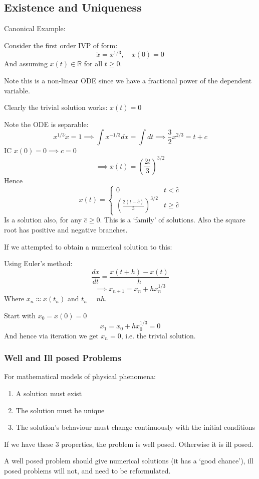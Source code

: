 \documentclass{/home/janmebows/Documents/LatexTemplates/myassignment}
\begin{document}
\subsection{Existence and Uniqueness}
Canonical Example:

Consider the first order IVP of form:
\[\dot x = x^{1/3},\quad x(0) = 0\]
And assuming $x(t) \in \mathbb{R}$ for all $t\geq 0$.

Note this is a non-linear ODE since we have a fractional power of the dependent variable.

Clearly the trivial solution works: $x(t) =0$

Note the ODE is separable:
\[x^{1/3} \dot x = 1 \implies \int x^{-1/3} dx = \int dt \implies \frac32 x^{2/3} = t+c\]
IC $x(0) = 0 \implies c=0$ 
\[\implies x(t) = \left(\frac{2t}{3}\right)^{3/2}\]
Hence
\[x(t) = \begin{cases}
    0& t < \hat c\\
    \left(\frac{2(t-\hat c)}{3}\right)^{3/2} & t\geq \hat c
\end{cases}\]
Is a solution also, for any $\hat c \geq 0$. This is a `family' of solutions. Also the square root has positive and negative branches.


If we attempted to obtain a numerical solution to this:

Using Euler's method:
\[\frac{dx}{dt} = \frac{x(t+h) - x(t)}{h}\]
\[\implies x_{n+1} = x_n + h x_n^{1/3}\]
Where $x_n \approx x(t_n)$ and $t_n = nh$.

Start with $x_0 = x(0) =0$
\[x_1 = x_0 + hx_0^{1/3} =0\]
And hence via iteration we get $x_n = 0$, i.e. the trivial solution.

\subsubsection{Well and Ill posed Problems}
For mathematical models of physical phenomena:
\begin{enumerate}
    \item A solution must exist
    \item The solution must be unique
    \item The solution's behaviour must change continuously with the initial conditions 
\end{enumerate}
If we have these 3 properties, the problem is well posed. Otherwise it is ill posed.

A well posed problem should give numerical solutions (it has a `good chance'), ill posed problems will not, and need to be reformulated.
\end{document}
